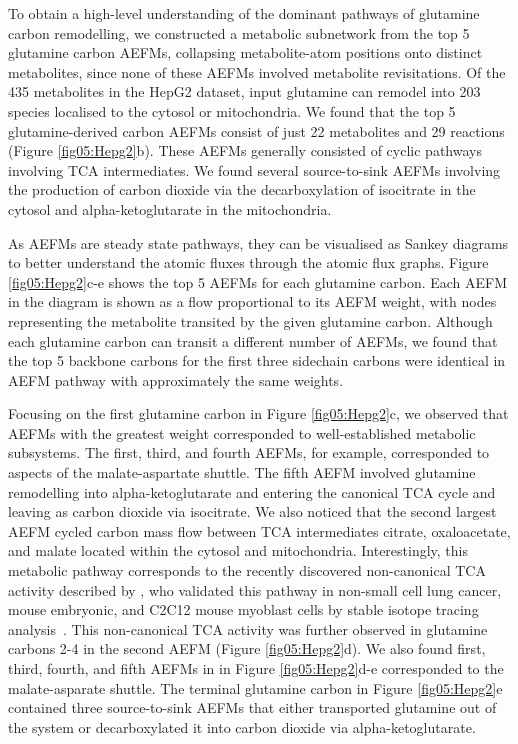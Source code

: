 \documentclass[12pt]{article}
\begin{document}
To obtain a high-level understanding of the dominant pathways of glutamine
carbon remodelling, we constructed a metabolic subnetwork from the top
5 glutamine carbon AEFMs, collapsing metabolite-atom positions onto
distinct metabolites, since none of these AEFMs involved metabolite
revisitations. Of the 435 metabolites in the HepG2 dataset, input
glutamine can remodel into 203 species localised to the cytosol or
mitochondria. We found that the top 5 glutamine-derived carbon AEFMs
consist of just 22 metabolites and 29 reactions (Figure
\ref{fig05:Hepg2}b). These AEFMs generally consisted of cyclic pathways
involving TCA intermediates. We found several source-to-sink AEFMs
involving the production of carbon dioxide via the decarboxylation of
isocitrate in the cytosol and alpha-ketoglutarate in the mitochondria.

As AEFMs are steady state pathways, they can be visualised as Sankey
diagrams to better understand the atomic fluxes through the atomic flux
graphs. Figure \ref{fig05:Hepg2}c-e shows the top 5 AEFMs for each
glutamine carbon. Each AEFM in the diagram is shown as a flow proportional
to its AEFM weight, with nodes representing the metabolite transited by
the given glutamine carbon. Although each glutamine carbon can transit
a different number of AEFMs, we found that the top 5 backbone carbons for
the first three sidechain carbons were identical in AEFM pathway with
approximately the same weights.

Focusing on the first glutamine carbon in Figure \ref{fig05:Hepg2}c, we
observed that AEFMs with the greatest weight corresponded to
well-established metabolic subsystems. The first, third, and fourth AEFMs,
for example, corresponded to aspects of the malate-aspartate shuttle. The
fifth AEFM involved glutamine remodelling into alpha-ketoglutarate and
entering the canonical TCA cycle and leaving as carbon dioxide via
isocitrate. We also noticed that the second largest AEFM cycled carbon
mass flow between TCA intermediates citrate, oxaloacetate, and malate
located within the cytosol and mitochondria. Interestingly, this
metabolic pathway corresponds to the recently discovered non-canonical TCA
activity described by \citeauthor{ArnoldPaigeK2022Anta}, who validated
this pathway in non-small cell lung cancer, mouse embryonic, and C2C12
mouse myoblast cells by stable isotope tracing
analysis~\citep{ArnoldPaigeK2022Anta}. This non-canonical TCA activity was
further observed in glutamine carbons 2-4 in the second AEFM (Figure
\ref{fig05:Hepg2}d). We also found first, third, fourth, and fifth AEFMs
in in Figure \ref{fig05:Hepg2}d-e corresponded to the malate-asparate
shuttle. The terminal glutamine carbon in Figure \ref{fig05:Hepg2}e
contained three source-to-sink AEFMs that either transported glutamine out
of the system or decarboxylated it into carbon dioxide via
alpha-ketoglutarate.
\end{document}

